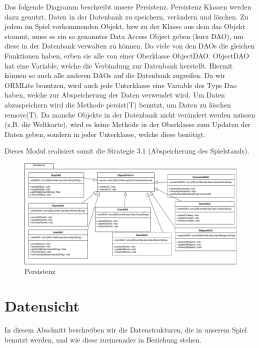 \documentclass[fontsize=12pt,paper=a4,twoside]{scrartcl}
\begin{document}
Das folgende Diagramm beschreibt unsere Persistenz. Persistenz Klassen werden dazu genutzt, Daten in der Datenbank zu speichern, verändern und löschen. Zu jedem im Spiel vorkommenden Objekt, bzw zu der Klasse aus dem das Objekt stammt, muss es ein so genanntes Data Access Object geben (kurz DAO), um diese in der Datenbank verwalten zu können.
Da viele von den DAOs die gleichen Funktionen haben, erben sie alle von einer Oberklasse ObjectDAO. ObjectDAO hat eine Variable, welche die Verbindung zur Datenbank herstellt. Hiermit können so auch alle anderen DAOs auf die Datenbank zugreifen. Da wir ORMLite benutzen, wird auch jede Unterklasse eine Variable des Typs Dao haben, welche zur Abspeicherung der Daten verwendet wird. Um Daten abzuspeichern wird die Methode persist(T) benutzt, um Daten zu löschen remove(T). Da manche Objekte in der Datenbank nicht verändert werden müssen (z.B. die Weltkarte), wird es keine Methode in der Oberklasse zum Updaten der Daten geben, sondern in jeder Unterklasse, welche diese benötigt.

Dieses Modul realisiert somit die Strategie 3.1 (Abspeicherung des Spielstands).

\begin{figure}[h!]
\begin{center}
  \includegraphics[width=\linewidth]{UML/PersistencePackage.pdf}
    \caption{Persistenz}
\end{center}
\end{figure}

\section{Datensicht} \label{sec:datensicht}

In diesem Abschnitt beschreiben wir die Datenstrukturen, die in unserem Spiel benutzt werden, und wie diese zueinenader in Beziehung stehen. \\
\end{document}
